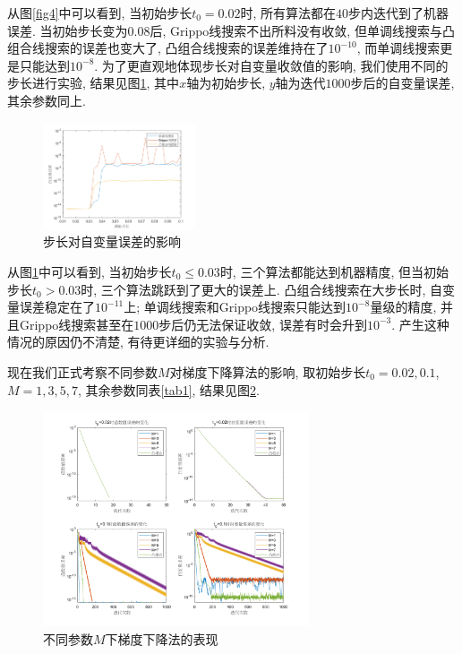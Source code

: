 \documentclass[UTF8]{ctexart}
\begin{document}
从图\ref{fig4}中可以看到, 当初始步长$t_0=0.02$时, 所有算法都在$40$步内迭代到了机器误差. 当初始步长变为$0.08$后, Grippo线搜索不出所料没有收敛, 但单调线搜索与凸组合线搜索的误差也变大了, 凸组合线搜索的误差维持在了$10^{-10}$, 而单调线搜索更是只能达到$10^{-8}$. 为了更直观地体现步长对自变量收敛值的影响, 我们使用不同的步长进行实验, 结果见图\ref{fig5}, 其中$x$轴为初始步长, $y$轴为迭代$1000$步后的自变量误差, 其余参数同上. \par
\begin{figure}[htb]
    \centering
    \includegraphics[width=0.4\textwidth]{Q2-figure/5.png}
    \caption{步长对自变量误差的影响}\label{fig5}
\end{figure}
从图\ref{fig5}中可以看到, 当初始步长$t_0\leq 0.03$时, 三个算法都能达到机器精度, 但当初始步长$t_0>0.03$时, 三个算法跳跃到了更大的误差上. 凸组合线搜索在大步长时, 自变量误差稳定在了$10^{-11}$上; 单调线搜索和Grippo线搜索只能达到$10^{-8}$量级的精度, 并且Grippo线搜索甚至在$1000$步后仍无法保证收敛, 误差有时会升到$10^{-3}$. 产生这种情况的原因仍不清楚, 有待更详细的实验与分析. \par
现在我们正式考察不同参数$M$对梯度下降算法的影响, 取初始步长$t_0=0.02,0.1$, $M=1,3,5,7$, 其余参数同表\ref{tab1}, 结果见图\ref{fig6}. \par
\begin{figure}[htb]
    \centering
    \includegraphics[width=0.7\textwidth]{Q2-figure/6.png}
    \caption{不同参数$M$下梯度下降法的表现}\label{fig6}
\end{figure}
\end{document}
